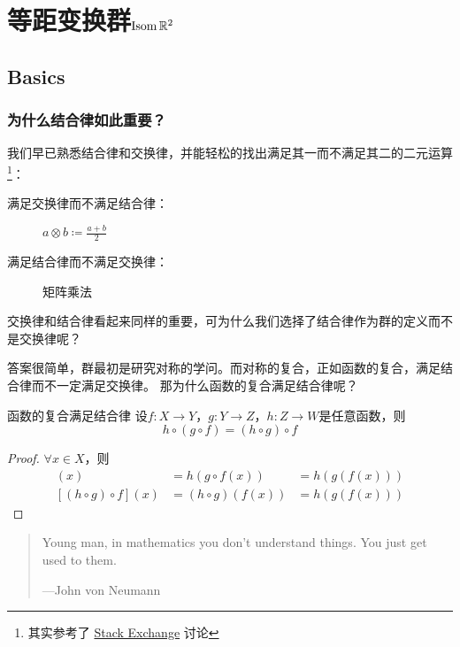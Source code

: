 \chapter{等距变换群\(\operatorname{\mathrm{Isom}} \mathbb{R}^{2}\)}

\section{Basics}

\subsection{为什么结合律如此重要？}
我们早已熟悉结合律和交换律，并能轻松的找出满足其一而不满足其二的二元运算\footnote{其实参考了
    \href{https://math.stackexchange.com/questions/608280/real-life-examples-of-commutative-but-non-associative-operations}{Stack
    Exchange}
讨论}：

\begin{description}
    \item[满足交换律而不满足结合律：] \(a \otimes b \coloneqq \frac{a+b}{2}\)
    \item[满足结合律而不满足交换律：] 矩阵乘法
\end{description}

交换律和结合律看起来同样的重要，可为什么我们选择了结合律作为群的定义而不是交换律呢？

答案很简单，群最初是研究对称的学问。而对称的复合，正如函数的复合，满足结合律而不一定满足交换律。
那为什么函数的复合满足结合律呢？

\begin{theorem}{函数的复合满足结合律}
    设\(f: X\to Y\)，\(g: Y\to Z\)，\(h: Z\to W\)是任意函数，则
    \[
        h\circ(g\circ f)=(h\circ g)\circ f
    \]
\end{theorem}

\begin{proof}
    \(\forall x\in X\)，则
    \begin{align*}
        [h\circ(g\circ f)](x) & = h(g \circ f(x))  & = h(g(f(x))) \\
        [(h\circ g)\circ f](x) & = (h\circ g)(f(x)) & = h(g(f(x)))
    \end{align*}
\end{proof}

\begin{quote}
    Young man, in mathematics you don't understand things.
    You just get used to them.

    \hfill ---John von Neumann
\end{quote}

